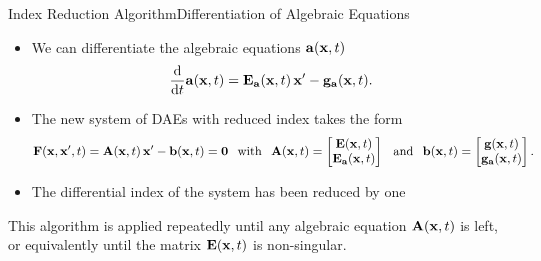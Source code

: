 \begin{frame}{Index Reduction Algorithm}{Differentiation of Algebraic Equations}
  \begin{itemize}
    \item We can differentiate the algebraic equations $\mathbf{a}(\mathbf{x}, t)$
    \begin{equation*}
      \dfrac{\mathrm{d}}{\mathrm{d}t} \mathbf{a}(\mathbf{x}, t) = \mathbf{E}_{\mathbf{a}}(\mathbf{x}, t) \, \mathbf{x}^\prime - \mathbf{g}_{\mathbf{a}}(\mathbf{x}, t) \text{.}
    \end{equation*}
    \item The new system of \acp{DAE} with reduced index takes the form
    \begin{align*}
      \mathbf{F}(\mathbf{x}, \mathbf{x}^\prime, t) = \mathbf{A}(\mathbf{x}, t) \, \mathbf{x}^\prime - \mathbf{b}(\mathbf{x}, t) = \mathbf{0}
      \hspace{0.75em} \text{with} \hspace{0.75em}
      \mathbf{A}(\mathbf{x}, t) = \begin{bmatrix} \mathbf{E}(\mathbf{x}, t) \\ \mathbf{E}_{\mathbf{a}}(\mathbf{x}, t) \end{bmatrix}
      \hspace{0.75em} \text{and} \hspace{0.75em}
      \mathbf{b}(\mathbf{x}, t) = \begin{bmatrix} \mathbf{g}(\mathbf{x}, t) \\ \mathbf{g}_{\mathbf{a}}(\mathbf{x}, t) \end{bmatrix} \text{.}
    \end{align*}
    \item The differential index of the system has been reduced by one
  \end{itemize}
  \begin{bbox}
    This algorithm is applied repeatedly until any algebraic equation $\mathbf{A}(\mathbf{x}, t)$ is left, or equivalently until the matrix $\mathbf{E}(\mathbf{x}, t)$ is non-singular.
  \end{bbox}
\end{frame}

